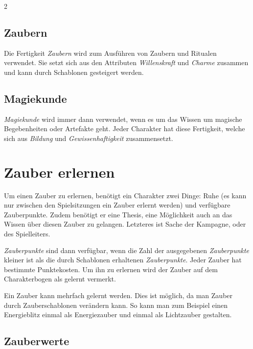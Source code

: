 \begin{multicols}{2}

\subsection{Zaubern}

Die Fertigkeit \textit{Zaubern} wird zum Ausführen von Zaubern und Ritualen verwendet. Sie setzt sich aus den Attributen \textit{Willenskraft} und \textit{Charme} zusammen und kann durch Schablonen gesteigert werden.

\subsection{Magiekunde}

\textit{Magiekunde} wird immer dann verwendet, wenn es um das Wissen um magische Begebenheiten oder Artefakte geht. Jeder Charakter hat diese Fertigkeit, welche sich aus \textit{Bildung} und \textit{Gewissenhaftigkeit} zusammensetzt.

\section{Zauber erlernen}

Um einen Zauber zu erlernen, benötigt ein Charakter zwei Dinge: Ruhe (es kann nur zwischen den Spielsitzungen ein Zauber erlernt werden) und verfügbare Zauberpunkte. Zudem benötigt er eine Thesis, eine Möglichkeit auch an das Wissen über diesen Zauber zu gelangen. Letzteres ist Sache der Kampagne, oder des Spielleiters.

\textit{Zauberpunkte} sind dann verfügbar, wenn die Zahl der ausgegebenen \textit{Zauberpunkte} kleiner ist als die durch Schablonen erhaltenen \textit{Zauberpunkte}. Jeder Zauber hat bestimmte Punktekosten. Um ihn zu erlernen wird der Zauber auf dem Charakterbogen als gelernt vermerkt.

Ein Zauber kann mehrfach gelernt werden. Dies ist möglich, da man Zauber durch Zauberschablonen verändern kann. So kann man zum Beispiel einen Energieblitz einmal als Energiezauber und einmal als Lichtzauber gestalten.

\subsection{Zauberwerte}


\end{multicols}
